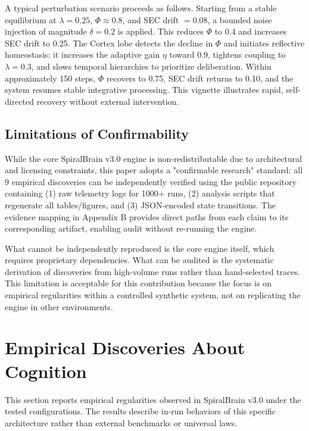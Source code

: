 \documentclass[11pt,a4paper]{article}
\begin{document}
A typical perturbation scenario proceeds as follows. Starting from a stable equilibrium at \( \lambda = 0.25 \), \( \Phi \approx 0.8 \), and SEC drift \( = 0.08 \), a bounded noise injection of magnitude \( \delta = 0.2 \) is applied. This reduces \( \Phi \) to 0.4 and increases SEC drift to 0.25. The Cortex lobe detects the decline in \( \Phi \) and initiates reflective homeostasis: it increases the adaptive gain \( \eta \) toward 0.9, tightens coupling to \( \lambda = 0.3 \), and slows temporal hierarchies to prioritize deliberation. Within approximately 150 steps, \( \Phi \) recovers to 0.75, SEC drift returns to 0.10, and the system resumes stable integrative processing. This vignette illustrates rapid, self-directed recovery without external intervention.

\subsection{Limitations of Confirmability}

While the core SpiralBrain v3.0 engine is non-redistributable due to architectural and licensing constraints, this paper adopts a "confirmable research" standard: all 9 empirical discoveries can be independently verified using the public repository containing (1) raw telemetry logs for 1000+ runs, (2) analysis scripts that regenerate all tables/figures, and (3) JSON-encoded state transitions. The evidence mapping in Appendix B provides direct paths from each claim to its corresponding artifact, enabling audit without re-running the engine.

What cannot be independently reproduced is the core engine itself, which requires proprietary dependencies. What can be audited is the systematic derivation of discoveries from high-volume runs rather than hand-selected traces. This limitation is acceptable for this contribution because the focus is on empirical regularities within a controlled synthetic system, not on replicating the engine in other environments.

\section{Empirical Discoveries About Cognition}
\label{sec:discoveries}

This section reports empirical regularities observed in SpiralBrain v3.0 under the tested configurations. The results describe in-run behaviors of this specific architecture rather than external benchmarks or universal laws.
\end{document}
